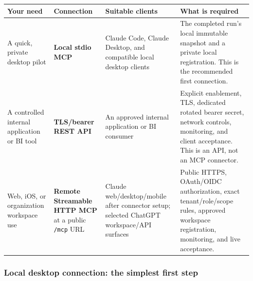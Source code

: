 \documentclass[
]{article}
\newcounter{none} %
\begin{document}
{\def\LTcaptype{none} %
\begin{longtable}[]{@{}
  >{\raggedright\arraybackslash}p{}
  >{\raggedright\arraybackslash}p{}
  >{\raggedright\arraybackslash}p{}
  >{\raggedright\arraybackslash}p{}@{}}
\toprule\noalign{}
\begin{minipage}[b]{\linewidth}\raggedright
Your need
\end{minipage} & \begin{minipage}[b]{\linewidth}\raggedright
Connection
\end{minipage} & \begin{minipage}[b]{\linewidth}\raggedright
Suitable clients
\end{minipage} & \begin{minipage}[b]{\linewidth}\raggedright
What is required
\end{minipage} \\
\midrule\noalign{}
\endhead
\bottomrule\noalign{}
\endlastfoot
A quick, private desktop pilot & \textbf{Local stdio MCP} & Claude Code,
Claude Desktop, and compatible local desktop clients & The completed
run's local immutable snapshot and a private local registration. This is
the recommended first connection. \\
A controlled internal application or BI tool & \textbf{TLS/bearer REST
API} & An approved internal application or BI consumer & Explicit
enablement, TLS, dedicated rotated bearer secret, network controls,
monitoring, and client acceptance. This is an API, not an MCP
connector. \\
Web, iOS, or organization workspace use & \textbf{Remote Streamable HTTP
MCP} at a public \texttt{/\allowbreak{}mcp} URL & Claude
web/desktop/mobile after connector setup; selected ChatGPT workspace/API
surfaces & Public HTTPS, OAuth/OIDC authorization, exact
tenant/role/scope rules, approved workspace registration, monitoring,
and live acceptance. \\
\end{longtable}
}

\subsubsection{Local desktop connection: the simplest first
step}\label{local-desktop-connection-the-simplest-first-step}
\end{document}
